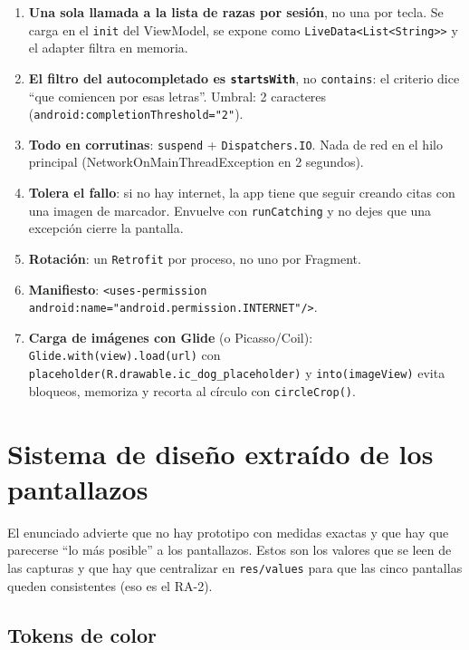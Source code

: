 \documentclass[11pt,letterpaper]{article}
\newcommand{\code}[1]{\texttt{\small #1}}
\begin{document}
\begin{enumerate}[leftmargin=1.6em,itemsep=3pt]
  \item \textbf{Una sola llamada a la lista de razas por sesi\'on}, no una por
        tecla. Se carga en el \code{init} del ViewModel, se expone como
        \code{LiveData<List<String>>} y el adapter filtra en memoria.
  \item \textbf{El filtro del autocompletado es \code{startsWith}}, no
        \code{contains}: el criterio dice ``que comiencen por esas letras''.
        Umbral: 2 caracteres (\code{android:\allowbreak{}completionThreshold=\allowbreak{}"2"}).
  \item \textbf{Todo en corrutinas}: \code{suspend} + \code{Dispatchers.\allowbreak{}IO}. Nada
        de red en el hilo principal (NetworkOnMainThreadException en 2 segundos).
  \item \textbf{Tolera el fallo}: si no hay internet, la app tiene que seguir
        creando citas con una imagen de marcador. Envuelve con
        \code{runCatching} y no dejes que una excepci\'on cierre la pantalla.
  \item \textbf{Rotaci\'on}: un \code{Retrofit} por proceso, no uno por Fragment.
  \item \textbf{Manifiesto}: \code{<uses-permission android:\allowbreak{}name="android.\allowbreak{}permission.\allowbreak{}INTERNET"/\allowbreak{}>}.
  \item \textbf{Carga de im\'agenes con Glide} (o Picasso/Coil):
        \code{Glide.with(view).load(url)} con \code{placeholder(\allowbreak{}R.drawable.\allowbreak{}ic\_dog\_placeholder)} y \code{into(imageView)}
        evita bloqueos, memoriza y recorta al c\'irculo con
        \code{circleCrop(\allowbreak{})}.
\end{enumerate}

\section{Sistema de dise\~no extra\'ido de los pantallazos}
\label{sec:diseno}

El enunciado advierte que no hay prototipo con medidas exactas y que hay que
parecerse ``lo m\'as posible'' a los pantallazos. Estos son los valores que se
leen de las capturas y que hay que centralizar en \code{res/values} para que las
cinco pantallas queden consistentes (eso es el RA-2).

\subsection{Tokens de color}
\end{document}

